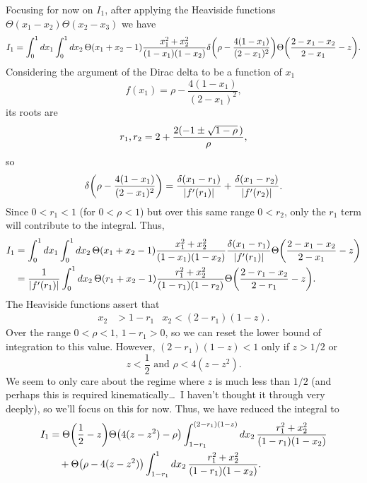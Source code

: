 \documentclass[11pt,twoside,reqno]{amsart}
\theoremstyle{plain}
\theoremstyle{remark}
\theoremstyle{definition}
\theoremstyle{remark}
\theoremstyle{definition}
\theoremstyle{definition}
\begin{document}
Focusing for now on $I_1$, after applying the Heaviside functions $\Theta(x_1 - x_2)\Theta(x_2 - x_3)$ we have
\begin{equation}
	I_1 = \int_0^1 dx_1 \int_0^1 dx_2\, \Theta(x_1 + x_2 - 1) \frac{x_1^2 + x_2^2}{(1 - x_1)(1 - x_2)} \delta\qty(\rho - \frac{4(1 - x_1)}{(2 - x_1)^2}) \Theta\qty(\frac{2 - x_1 - x_2}{2 - x_1} - z).
\end{equation}
Considering the argument of the Dirac delta to be a function of $x_1$
\begin{equation}
	f(x_1) = \rho - \frac{4(1 - x_1)}{(2 - x_1)^2},
\end{equation}
its roots are
\begin{equation}
	r_1, r_2 = 2 + \frac{2\qty(-1 \pm \sqrt{1 - \rho}\,)}{\rho},
\end{equation}
so
\begin{equation}
	\delta\qty(\rho - \frac{4(1 - x_1)}{(2 - x_1)^2}) = \frac{\delta(x_1 - r_1)}{\abs{f'(r_1)}} + \frac{\delta(x_1 - r_2)}{\abs{f'(r_2)}}.
\end{equation}
Since $0 < r_1 < 1$ (for $0 < \rho < 1$) but over this same range $0 < r_2$, only the $r_1$ term will contribute to the integral. Thus,
\begin{align}
	I_1 &= \int_0^1 dx_1 \int_0^1 dx_2\, \Theta(x_1 + x_2 - 1) \frac{x_1^2 + x_2^2}{(1 - x_1)(1 - x_2)} \frac{\delta\qty(x_1 - r_1)}{\abs{f'(r_1)}} \Theta\qty(\frac{2 - x_1 - x_2}{2 - x_1} - z) \\
	&= \frac{1}{\abs{f'(r_1)}}\int_0^1 dx_2 \, \Theta(r_1 + x_2 - 1) \frac{r_1^2 + x_2^2}{(1 - r_1)(1 - r_2)} \Theta\qty(\frac{2 - r_1 - x_2}{2 - r_1} - z).
\end{align}
The Heaviside functions assert that
\begin{align}
	x_2 &> 1 - r_1 & x_2 < (2 - r_1)(1 - z).
\end{align}
Over the range $0 < \rho < 1$, $1 - r_1 > 0$, so we can reset the lower bound of integration to this value. However, $(2 - r_1)(1 - z) < 1$ only if $z > 1/2$ or
\begin{equation}
	z < \frac{1}{2} \text{ and } \rho < 4(z - z^2).
\end{equation}
We seem to only care about the regime where $z$ is much less than $1/2$ (and perhaps this is required kinematically\ldots\ I haven't thought it through very deeply), so we'll focus on this for now. Thus, we have reduced the integral to
\begin{equation}\label{eq:split_integral}
\begin{aligned}
	I_1 &= \Theta\qty(\frac{1}{2} - z)\Theta\qty(4(z - z^2) - \rho) \int_{1 - r_1}^{(2 - r_1)(1 - z)}dx_2\, \frac{r_1^2 + x_2^2}{(1 - r_1)(1 - x_2)} \\
	&\quad + \Theta\qty(\rho - 4(z - z^2))\int_{1 - r_1}^{1}dx_2\, \frac{r_1^2 + x_2^2}{(1 - r_1)(1 - x_2)}.
\end{aligned}
\end{equation}
\end{document}

